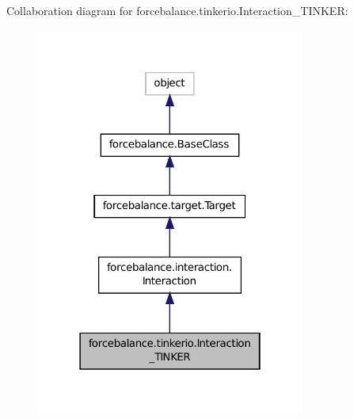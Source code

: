 Collaboration diagram for forcebalance.\-tinkerio.\-Interaction\-\_\-\-T\-I\-N\-K\-E\-R\-:
\nopagebreak
\begin{figure}[H]
\begin{center}
\leavevmode
\includegraphics[width=250pt]{classforcebalance_1_1tinkerio_1_1Interaction__TINKER__coll__graph}
\end{center}
\end{figure}
